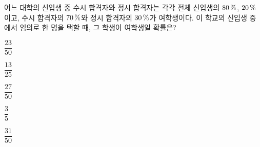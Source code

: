 어느 대학의 신입생 중 수시 합격자와 정시 합격자는 각각 전체 신입생의 $80\mkern3mu \%$, $20\mkern3mu \%$이고, 수시 합격자의 $70\mkern3mu \%$와 정시 합격자의 $30\mkern3mu \%$가 여학생이다. 이 학교의 신입생 중에서 임의로 한 명을 택할 때, 그 학생이 여학생일 확률은?
\begin{choices32}{\rule[-3ex]{0pt}{8ex}$\dfrac{23}{50}$}{\rule[-3ex]{0pt}{8ex}$\dfrac{13}{25}$}{\rule[-3ex]{0pt}{8ex}$\dfrac{27}{50}$}{\rule[-3ex]{0pt}{8ex}$\dfrac{3}{5}$}{\rule[-3ex]{0pt}{8ex}$\dfrac{31}{50}$}\end{choices32}

